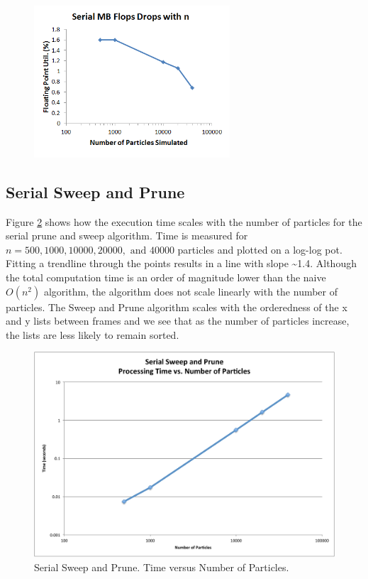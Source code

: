 \documentclass[11pt]{article} %
\begin{document}
\begin{figure}[!h]
\centering
\includegraphics[width=0.65\textwidth]{figures/serial_mb_flops.png}
\caption{}
\label{serial_mb_flops}
\end{figure}

\subsection{Serial Sweep and Prune}

Figure \ref{plot:serial_t_v_n} shows how the execution time scales
with the number of particles for the serial prune and sweep algorithm.
Time is measured for $n=500,1000,10000,20000,\text{ and }40000$ particles
and plotted on a log-log pot. Fitting a trendline through the points
results in a line with slope \textasciitilde{}1.4. Although the total
computation time is an order of magnitude lower than the naive $O(n^{2})$
algorithm, the algorithm does not scale linearly with the number of
particles. The Sweep and Prune algorithm scales with the orderedness
of the x and y lists between frames and we see that as the number
of particles increase, the lists are less likely to remain sorted. 

\begin{figure}
\begin{centering}
\includegraphics[width=0.5\paperwidth]{figures/serial_t_v_n}
\par\end{centering}

\caption{Serial Sweep and Prune. Time versus Number of Particles.}
\label{plot:serial_t_v_n}

\end{figure}
\end{document}
